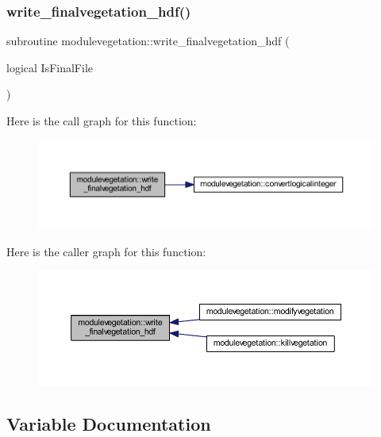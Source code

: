 \subsubsection{\texorpdfstring{write\+\_\+finalvegetation\+\_\+hdf()}{write\_finalvegetation\_hdf()}}
{\footnotesize\ttfamily subroutine modulevegetation\+::write\+\_\+finalvegetation\+\_\+hdf (\begin{DoxyParamCaption}\item[{logical}]{Is\+Final\+File }\end{DoxyParamCaption})\hspace{0.3cm}{\ttfamily [private]}}

Here is the call graph for this function\+:\nopagebreak
\begin{figure}[H]
\begin{center}
\leavevmode
\includegraphics[width=350pt]{namespacemodulevegetation_ad1ed23055b336a8f8253483f2289121b_cgraph}
\end{center}
\end{figure}
Here is the caller graph for this function\+:\nopagebreak
\begin{figure}[H]
\begin{center}
\leavevmode
\includegraphics[width=350pt]{namespacemodulevegetation_ad1ed23055b336a8f8253483f2289121b_icgraph}
\end{center}
\end{figure}


\subsection{Variable Documentation}
\mbox{\label{namespacemodulevegetation_a6c9a5abf22d1f3911992e9fe7ca54961}} 
